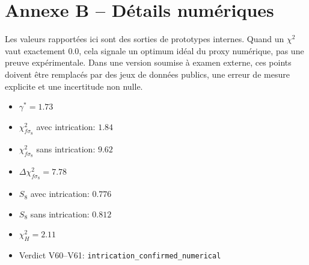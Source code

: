 \section{Annexe B -- Détails numériques}
Les valeurs rapportées ici sont des sorties de prototypes internes. Quand un $\chi^2$ vaut exactement $0.0$, cela signale un optimum idéal du proxy numérique, pas une preuve expérimentale. Dans une version soumise à examen externe, ces points doivent être remplacés par des jeux de données publics, une erreur de mesure explicite et une incertitude non nulle.

\begin{itemize}
    \item $\gamma^*=1.73$
    \item $\chi^2_{f\sigma_8}$ avec intrication: $1.84$
    \item $\chi^2_{f\sigma_8}$ sans intrication: $9.62$
    \item $\Delta\chi^2_{f\sigma_8}=7.78$
    \item $S_8$ avec intrication: $0.776$
    \item $S_8$ sans intrication: $0.812$
    \item $\chi^2_H=2.11$
    \item Verdict V60--V61: \texttt{intrication\_confirmed\_numerical}
\end{itemize}